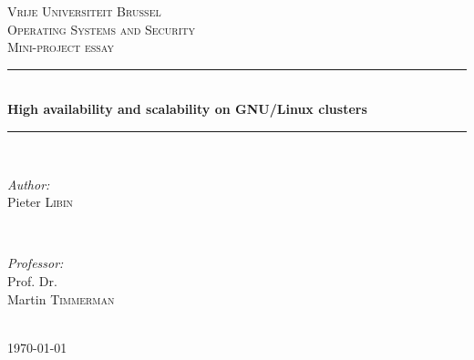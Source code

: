 \documentclass[12pt]{report}
\begin{document}

\begin{titlepage}

\newcommand{\HRule}{\rule{\linewidth}{0.5mm}} %

\center %

\textsc{\LARGE Vrije Universiteit Brussel}\\[1.5cm] 
\textsc{\Large Operating Systems and Security}\\[0.5cm] 
\textsc{\large Mini-project essay}\\[0.5cm] 

\HRule \\[0.4cm]
{ \huge \bfseries High availability and scalability on GNU/Linux clusters}\\[0.4cm] %
\HRule \\[1.5cm]

\begin{minipage}{0.4\textwidth}
\begin{flushleft} \large
\emph{Author:}\\
Pieter \textsc{Libin} %
\end{flushleft}
\end{minipage}
~
\begin{minipage}{0.4\textwidth}
\begin{flushright} \large
\emph{Professor:} \\
Prof. Dr. \\Martin \textsc{Timmerman} 
\end{flushright}
\end{minipage}\\[4cm]

{\large \today}\\[3cm] %


\vfill %

\end{titlepage}

\end{document}
